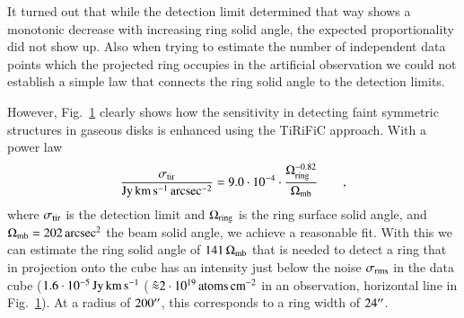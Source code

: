 \documentclass[oldversion]{aa}
\begin{document}
{\begin{figure}
\label{fig_sens}
\end{figure}
It turned out that while the detection limit determined that way shows
a monotonic decrease with increasing ring solid angle, the expected
proportionality did not show up. Also when trying to estimate the
number of independent data points which the projected ring occupies in the
artificial observation we could not establish a simple law that connects the
ring solid angle to the detection limits.

However, Fig.~\ref{fig_sens} clearly shows how the sensitivity in
detecting faint symmetric structures in gaseous disks is enhanced
using the TiRiFiC approach. With a power law
\begin{equation}
\label{eqn}
\frac{\sigma_{\rm tir}}{{\rm Jy}\,{\rm km}\,{\rm s}^{-1}\,{\rm arcsec}^{-2}} = 9.0\cdot 10^{-4}\cdot \frac{\Omega_{\rm ring}^{-0.82}}{\Omega_{\rm mb}} \qquad ,
\end{equation}
where $\sigma_{\rm tir}$ is the detection limit and $\Omega_{\rm
ring}$ is the ring surface solid angle, and $\Omega_{\rm mb} = 202\,
{\rm arcsec}^2$ the beam solid angle, we achieve a reasonable fit. With this we can estimate the ring solid angle of $141\,\Omega_{\rm mb}$ that is needed to detect a ring that in projection onto
the cube has an intensity just below the noise $\sigma_{\rm rms}$ in the data cube ($1.6\cdot 10^{-5}\,{\rm Jy}\,{\rm km}\,{\rm s}^{-1}$ ($\,\hat{\approx}
2\cdot 10^{19} \,{\rm atoms}\,{\rm cm}^{-2}$ in an  observation, horizontal
line in Fig.~\ref{fig_sens}). At a radius of $200\hbox{$^{\prime\prime}$}$, this
corresponds to a ring width of $24\hbox{$^{\prime\prime}$}$.

}
\end{document}
